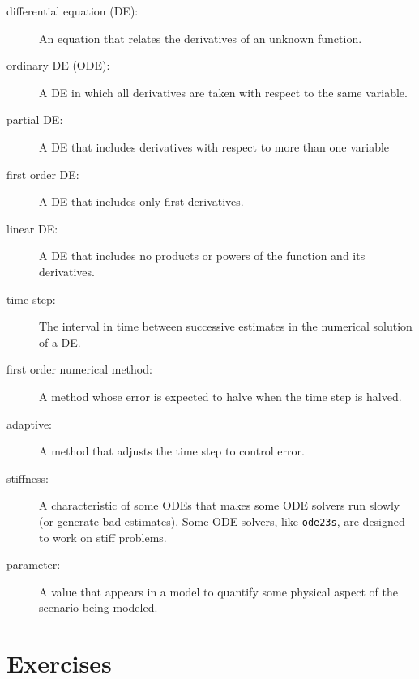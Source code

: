 \documentclass[
]{book}
\begin{document}
\begin{description}

\item[differential equation (DE):] An equation that relates the
derivatives of an unknown function.

\item[ordinary DE (ODE):] A DE in which all derivatives are taken with
respect to the same variable.

\item[partial DE:] A DE that includes derivatives with respect to
more than one variable

\item[first order DE:] A DE that includes only first derivatives.

\item[linear DE:] A DE that includes no products or powers of the
function and its derivatives.

\item[time step:] The interval in time between successive estimates
in the numerical solution of a DE.

\item[first order numerical method:] A method whose error is expected
to halve when the time step is halved.

\item[adaptive:] A method that adjusts the time step to control error.

\item[stiffness:] A characteristic of some ODEs that makes some ODE
solvers run slowly (or generate bad estimates).  Some ODE solvers,
like {\tt ode23s}, are designed to work on stiff problems.

\item[parameter:] A value that appears in a model to quantify some
physical aspect of the scenario being modeled.

\end{description}

\section{Exercises}

\newcommand{\degree}{\ensuremath{^\circ}}
\end{document}
